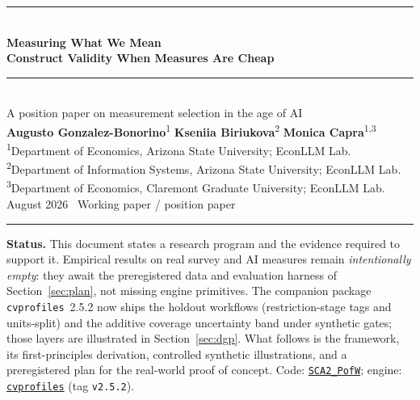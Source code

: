 \documentclass[10pt,letterpaper]{article}
\newcommand{\cvp}{\texttt{cvprofiles}}
\begin{document}
\thispagestyle{empty}
\begin{center}
\vspace*{1.1cm}
{\color{econblue}\rule{\textwidth}{1.15pt}}\\[0.45em]
{\LARGE\bfseries\color{econblue} Measuring What We Mean}\\[0.16em]
{\LARGE\bfseries\color{econblue} Construct Validity When Measures Are Cheap}\\[0.45em]
{\color{econblue}\rule{\textwidth}{0.55pt}}\\[0.75em]
{\large A position paper on measurement selection in the age of AI}\\[0.95em]
{\large\textbf{Augusto Gonzalez-Bonorino}\textsuperscript{1}\quad
\textbf{Kseniia Biriukova}\textsuperscript{2}\quad
\textbf{Monica Capra}\textsuperscript{1,3}}\\[0.5em]
{\small\textsuperscript{1}Department of Economics, Arizona State University; EconLLM Lab.\\
\textsuperscript{2}Department of Information Systems, Arizona State University; EconLLM Lab.\\
\textsuperscript{3}Department of Economics, Claremont Graduate University; EconLLM Lab.}\\[0.75em]
{\normalsize August 2026 \textperiodcentered\ Working paper / position paper}\\[0.35em]
{\color{econblue}\rule{0.28\textwidth}{0.35pt}}
\end{center}

\vspace{0.6em}
\noindent\colorbox{mist}{\parbox{0.965\textwidth}{\small\vspace{0.3em}
\textbf{Status.} This document states a research program and the evidence required to support it.
Empirical results on real survey and AI measures remain \emph{intentionally empty}: they await the preregistered data and evaluation harness of Section~\ref{sec:plan}, not missing engine primitives.
The companion package \cvp{}~2.5.2 now ships the holdout workflows (restriction-stage tags and units-split) and the additive coverage uncertainty band under synthetic gates; those layers are illustrated in Section~\ref{sec:dgp}.
What follows is the framework, its first-principles derivation, controlled synthetic illustrations, and a preregistered plan for the real-world proof of concept.
Code: \href{https://github.com/EconLLM-Lab/SCA2_PofW}{\texttt{SCA2\_PofW}}; engine: \href{https://github.com/Bonorinoa/cvprofiles}{\texttt{cvprofiles}} (tag \texttt{v2.5.2}).
\vspace{0.3em}}}
\end{document}
